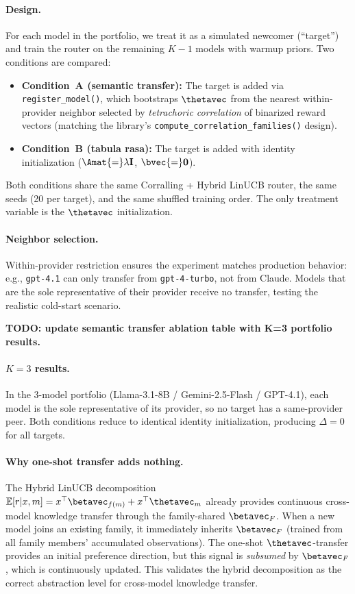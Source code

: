 \paragraph{Design.}
For each model in the portfolio, we treat it as a simulated newcomer
(``target'') and train the router on the remaining $K{-}1$ models with
warmup priors.  Two conditions are compared:
\begin{itemize}[nosep]
    \item \textbf{Condition~A (semantic transfer):} The target is added via
      \texttt{register\_model()}, which bootstraps $\thetavec$ from the
      nearest within-provider neighbor selected by \emph{tetrachoric
      correlation} of binarized reward vectors (matching the library's
      \texttt{compute\_correlation\_families()} design).
    \item \textbf{Condition~B (tabula rasa):} The target is added with
      identity initialization ($\Amat{=}\lambda\mathbf{I}$, $\bvec{=}\mathbf{0}$).
\end{itemize}
Both conditions share the same Corralling + Hybrid LinUCB router, the same
seeds (20 per target), and the same shuffled training order.  The only
treatment variable is the $\thetavec$ initialization.

\paragraph{Neighbor selection.}
Within-provider restriction ensures the experiment matches production
behavior: e.g., \texttt{gpt-4.1} can only transfer from \texttt{gpt-4-turbo},
not from Claude.  Models that are the sole representative of their provider
receive no transfer, testing the realistic cold-start scenario.

\textbf{TODO: update semantic transfer ablation table with K=3 portfolio results.}

\paragraph{$K{=}3$ results.}
In the 3-model portfolio (Llama-3.1-8B / Gemini-2.5-Flash / GPT-4.1), each model
is the sole representative of its provider, so no target has a same-provider peer.
Both conditions reduce to identical identity initialization, producing $\Delta{=}0$
for all targets.
\label{tab:semantic_transfer}

\paragraph{Why one-shot transfer adds nothing.}
The Hybrid LinUCB decomposition $\mathbb{E}[r|x,m] = x^\top\betavec_{f(m)} + x^\top\thetavec_m$
already provides continuous cross-model knowledge transfer through the
family-shared $\betavec_F$.  When a new model joins an existing family, it
immediately inherits $\betavec_F$ (trained from all family members' accumulated
observations).  The one-shot $\thetavec$-transfer provides an initial preference
direction, but this signal is \emph{subsumed} by $\betavec_F$, which is
continuously updated.  This validates the hybrid decomposition as the correct
abstraction level for cross-model knowledge transfer.

